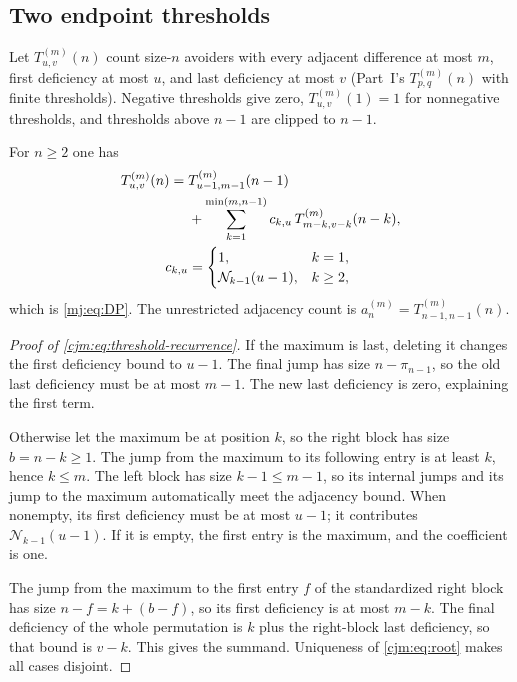 \documentclass[11pt,a4paper]{article}
\theoremstyle{definition}\newaliascnt{definition}{theorem}
\theoremstyle{remark}\newaliascnt{remark}{theorem}
\begin{document}
\subsection{Two endpoint thresholds}
Let $T^{(m)}_{u,v}(n)$ count size-$n$ avoiders with every adjacent
difference at most $m$, first deficiency at most $u$, and last deficiency at
most $v$ (Part~I's $T^{(m)}_{p,q}(n)$ with finite thresholds). Negative
thresholds give zero, $T^{(m)}_{u,v}(1)=1$ for nonnegative thresholds, and
thresholds above $n-1$ are clipped to $n-1$.

For $n\ge2$ one has
\begin{align}
 T^{(m)}_{u,v}(n)={}&T^{(m)}_{u-1,m-1}(n-1)\notag\\
 &+\sum_{k=1}^{\min(m,n-1)}c_{k,u}\,
       T^{(m)}_{m-k,v-k}(n-k),
 \label{cjm:eq:threshold-recurrence}\\
 c_{k,u}&=\begin{cases}1,&k=1,\\\mathcal N_{k-1}(u-1),&k\ge2,\end{cases}
 \notag
\end{align}
which is \eqref{mj:eq:DP}. The unrestricted adjacency count is
$a_n^{(m)}=T^{(m)}_{n-1,n-1}(n)$.

\begin{proof}[Proof of \eqref{cjm:eq:threshold-recurrence}]
If the maximum is last, deleting it changes the first deficiency bound to
$u-1$. The final jump has size $n-\pi_{n-1}$, so the old last deficiency
must be at most $m-1$. The new last deficiency is zero, explaining the
first term.

Otherwise let the maximum be at position $k$, so the right block has size
$b=n-k\ge1$. The jump from the maximum to its following entry is at least
$k$, hence $k\le m$. The left block has size $k-1\le m-1$, so its internal
jumps and its jump to the maximum automatically meet the adjacency bound.
When nonempty, its first deficiency must be at most $u-1$; it contributes
$\mathcal N_{k-1}(u-1)$. If it is empty, the first entry is the maximum, and
the coefficient is one.

The jump from the maximum to the first entry $f$ of the standardized right
block has size $n-f=k+(b-f)$, so its first deficiency is at most $m-k$.
The final deficiency of the whole permutation is $k$ plus the right-block
last deficiency, so that bound is $v-k$. This gives the summand.
Uniqueness of \eqref{cjm:eq:root} makes all cases disjoint.
\end{proof}
\end{document}

